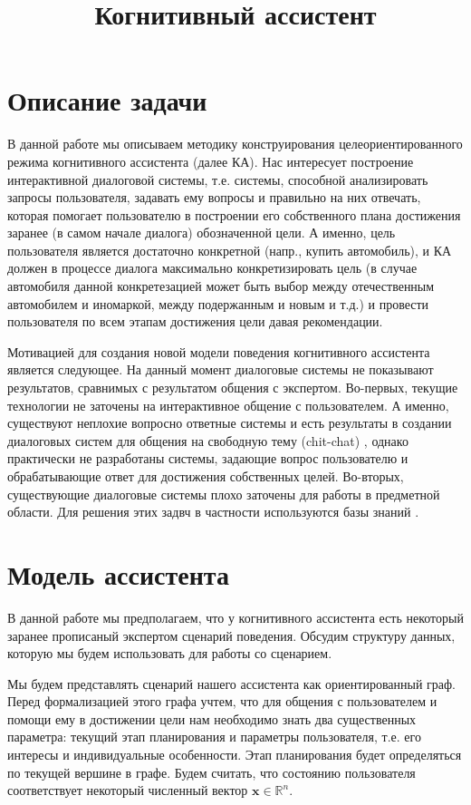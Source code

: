\documentclass[12pt]{article}
\title{Когнитивный ассистент}
\begin{document}
\maketitle

\section{Описание задачи}

В данной работе мы описываем методику конструирования целеориентированного режима когнитивного ассистента (далее КА). Нас интересует построение интерактивной диалоговой системы, т.е. системы, способной анализировать запросы пользователя, задавать ему вопросы и правильно на них отвечать, которая помогает пользователю в построении его собственного плана достижения заранее (в самом начале диалога) обозначенной цели. А именно, цель пользователя является достаточно конкретной (напр., купить автомобиль), и КА должен в процессе диалога максимально конкретизировать цель (в случае автомобиля данной конкретезацией может быть выбор между отечественным автомобилем и иномаркой, между подержанным и новым и т.д.) и провести пользователя по всем этапам достижения цели давая рекомендации.

Мотивацией для создания новой модели поведения когнитивного ассистента является следующее. На данный момент диалоговые системы не показывают результатов, сравнимых с результатом общения с экспертом. Во-первых, текущие технологии не заточены на интерактивное общение с пользователем. А именно, существуют неплохие вопросно ответные системы \cite{1} и есть результаты в создании диалоговых систем для общения на свободную тему (chit-chat) \cite{2}, однако практически не разработаны системы, задающие вопрос пользователю и обрабатывающие ответ для достижения собственных целей. Во-вторых, существующие диалоговые системы плохо заточены для работы в предметной области. Для решения этих задвч в частности используются базы знаний \cite{3}.

\section{Модель ассистента}

В данной работе мы предполагаем, что у когнитивного ассистента есть некоторый заранее прописаный экспертом сценарий поведения. Обсудим структуру данных, которую мы будем использовать для работы со сценарием.

Мы будем представлять сценарий нашего ассистента как ориентированный граф. Перед формализацией этого графа учтем, что для общения с пользователем и помощи ему в достижении цели нам необходимо знать два существенных параметра: текущий этап планирования и параметры пользователя, т.е. его интересы и индивидуальные особенности. Этап планирования будет определяться по текущей вершине в графе. Будем считать, что состоянию пользователя соответствует некоторый численный вектор $\textbf{x}\in \mathbb{R}^n$.
\end{document}
